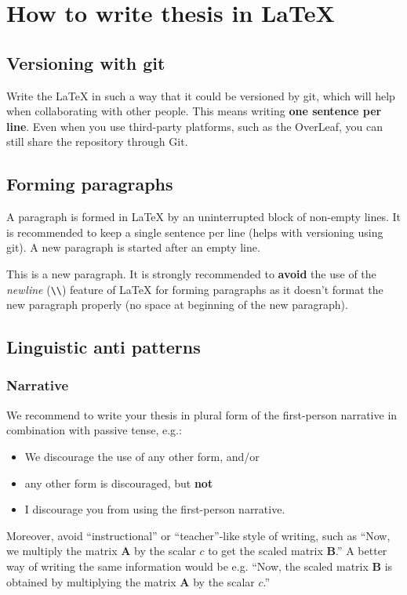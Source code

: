 \chapter{How to write thesis in LaTeX\label{chap:how_to}}

\section{Versioning with git}

Write the LaTeX in such a way that it could be versioned by git, which will help when collaborating with other people.
This means writing \textbf{one sentence per line}.
Even when you use third-party platforms, such as the OverLeaf, you can still share the repository through Git.

\section{Forming paragraphs}

A paragraph is formed in LaTeX by an uninterrupted block of non-empty lines.
It is recommended to keep a single sentence per line (helps with versioning using git).
A new paragraph is started after an empty line.

This is a new paragraph. It is strongly recommended to \textbf{avoid} the use of the \emph{newline} (\texttt{\textbackslash\textbackslash}) feature of LaTeX for forming paragraphs as it doesn't format the new paragraph properly (no space at beginning of the new paragraph).

\section{Linguistic anti patterns}

\subsection{Narrative}

We recommend to write your thesis in plural form of the first-person narrative in combination with passive tense, e.g.:
\begin{itemize}
    \item We discourage the use of any other form, and/or
    \item any other form is discouraged, but \textbf{not}
    \item {\color{red} I discourage you from using the first-person narrative}.
\end{itemize}
Moreover, avoid \enquote{instructional} or \enquote{teacher}-like style of writing, such as {\color{red} \enquote{Now, we multiply the matrix $\mathbf{A}$ by the scalar $c$ to get the scaled matrix $\mathbf{B}$.}}
A better way of writing the same information would be e.g. \enquote{Now, the scaled matrix $\mathbf{B}$ is obtained by multiplying the matrix $\mathbf{A}$ by the scalar $c$.}


